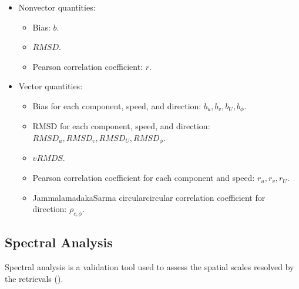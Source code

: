\documentclass[a4paper,10pt,english]{sphinxmanual}
\begin{document}
\sphinxAtStartPar
{}
\begin{itemize}
\item {} 
\sphinxAtStartPar
Non\sphinxhyphen{}vector quantities:
\begin{itemize}
\item {} 
\sphinxAtStartPar
Bias: \(b\).

\item {} 
\sphinxAtStartPar
\(RMSD\).

\item {} 
\sphinxAtStartPar
Pearson correlation coefficient: \(r\).

\end{itemize}

\item {} 
\sphinxAtStartPar
Vector quantities:
\begin{itemize}
\item {} 
\sphinxAtStartPar
Bias for each component, speed, and direction:
\(b_u,b_v,b_U,b_\phi\).

\item {} 
\sphinxAtStartPar
RMSD for each component, speed, and direction:
\(RMSD_u,RMSD_v,RMSD_U,RMSD_\phi\).

\item {} 
\sphinxAtStartPar
\(vRMDS\).

\item {} 
\sphinxAtStartPar
Pearson correlation coefficient for each component and speed:
\(r_u,r_v,r_U\).

\item {} 
\sphinxAtStartPar
Jammalamadaka\textendash{}Sarma circular\sphinxhyphen{}circular correlation coefficient for
direction: \(\rho_{c,\phi}\).

\end{itemize}

\end{itemize}


\subsection{Spectral Analysis}
\label{\detokenize{alg-02-validation:spectral-analysis}}
\sphinxAtStartPar
{}

\sphinxAtStartPar
Spectral analysis is a validation tool used to assess the spatial scales
resolved by the retrievals
({\hyperref[\detokenize{alg-02-validation:ref-vogelzang-spectral}]{}}).
\end{document}

